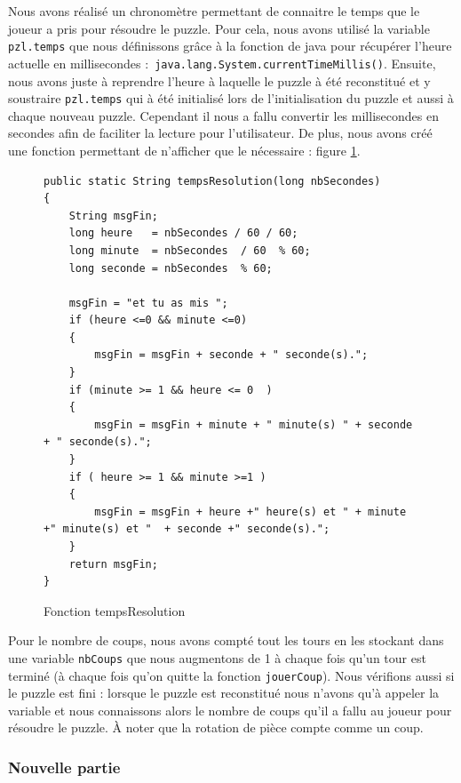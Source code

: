 \documentclass[]{article}
\newcommand{\variable}[1]{\noindent \texttt{#1}}
\begin{document}
Nous avons réalisé un chronomètre permettant de connaitre le temps que le joueur a pris pour résoudre le puzzle. 
Pour cela, nous avons utilisé la variable \variable{pzl.temps} que nous définissons grâce à la fonction de java pour récupérer l'heure actuelle en millisecondes :\variable{ java.lang.System.currentTimeMillis()}. 
Ensuite, nous avons juste à reprendre l'heure à laquelle le puzzle à été reconstitué et y soustraire \variable{pzl.temps} qui à été initialisé lors de l'initialisation du puzzle et aussi à chaque nouveau puzzle.
Cependant il nous a fallu convertir les millisecondes en secondes afin de faciliter la lecture pour l'utilisateur. De plus, nous avons créé une fonction permettant de n'afficher que le nécessaire : figure \no\ref{Fonction tempsResolution}.

\begin{figure}[hpt]
	\center
	\caption{\label{Fonction tempsResolution} Fonction tempsResolution}
\begin{lstlisting}
public static String tempsResolution(long nbSecondes)
{
    String msgFin;
    long heure   = nbSecondes / 60 / 60;
    long minute  = nbSecondes  / 60  % 60;
    long seconde = nbSecondes  % 60;

    msgFin = "et tu as mis ";
    if (heure <=0 && minute <=0)
    {
        msgFin = msgFin + seconde + " seconde(s).";
    }
    if (minute >= 1 && heure <= 0  )
    {
        msgFin = msgFin + minute + " minute(s) " + seconde + " seconde(s).";
    }
    if ( heure >= 1 && minute >=1 )
    {
        msgFin = msgFin + heure +" heure(s) et " + minute +" minute(s) et "  + seconde +" seconde(s).";
    }
    return msgFin;
}
\end{lstlisting}
\end{figure}

Pour le nombre de coups, nous avons compté tout les tours en les stockant dans une variable \variable{nbCoups} que nous augmentons de 1 à chaque fois qu'un tour est terminé (à chaque fois qu'on quitte la fonction \variable{jouerCoup}). Nous vérifions aussi si le puzzle est fini : lorsque le puzzle est reconstitué nous n'avons qu'à appeler la variable et nous connaissons alors le nombre de coups qu'il a fallu au joueur pour résoudre le puzzle. À noter que la rotation de pièce compte comme un coup.

\subsubsection{Nouvelle partie}
\end{document}
